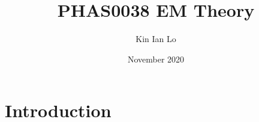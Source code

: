 \documentclass{article}
\title{PHAS0038 EM Theory}
\author{Kin Ian Lo}
\date{November 2020}
\begin{document}
\maketitle

\section{Introduction}
\end{document}
